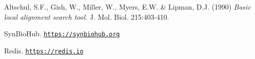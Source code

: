 \documentclass[journal,comsoc]{IEEEtran}
\begin{document}
%
%
%
\begin{thebibliography}{1}

Altschul, S.F., Gish, W., Miller, W., Myers, E.W. \& Lipman, D.J. (1990) 
  \emph{Basic local alignment search tool.} J. Mol. Biol. 215:403-410.

 SynBioHub. \underline{\texttt{https://synbiohub.org}}

 Redis. \underline{\texttt{https://redis.io}}

\end{thebibliography}

% 










\end{document}
